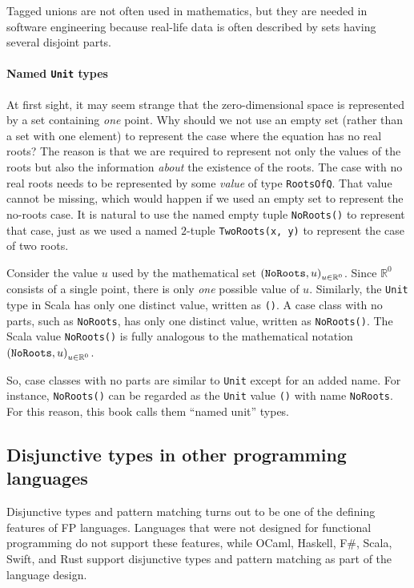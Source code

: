 Tagged unions are not often used in mathematics, but they are needed
in software engineering because real-life data is often described
by sets having several disjoint parts.

\paragraph{Named \texttt{Unit} types}

At first sight, it may seem strange that the zero-dimensional space
is represented by a set containing \emph{one} point. Why should we
not use an empty set (rather than a set with one element) to represent
the case where the equation has no real roots? The reason is that
we are required to represent not only the values of the roots but
also the information \emph{about} the existence of the roots. The
case with no real roots needs to be represented by some \emph{value}
of type \lstinline!RootsOfQ!. That value cannot be missing, which
would happen if we used an empty set to represent the no-roots case.
It is natural to use the named empty tuple \lstinline!NoRoots()!
to represent that case, just as we used a named $2$-tuple \lstinline!TwoRoots(x, y)!
to represent the case of two roots.

Consider the value $u$ used by the mathematical set $\left(\text{\texttt{NoRoots}},u\right)_{u\in\mathbb{R}^{0}}$.
Since $\mathbb{R}^{0}$ consists of a single point, there is only
\emph{one} possible value of $u$. Similarly, the \lstinline!Unit!
type in Scala has only one distinct value, written as \lstinline!()!.
A case class with no parts, such as \lstinline!NoRoots!, has only
one distinct value, written as \lstinline!NoRoots()!. The Scala value
\lstinline!NoRoots()! is fully analogous to the mathematical notation
$\left(\text{\texttt{NoRoots}},u\right)_{u\in\mathbb{R}^{0}}$.

So, case classes with no parts are similar to \lstinline!Unit! except
for an added name. For instance, \lstinline!NoRoots()! can be regarded
as the \lstinline!Unit! value \lstinline!()! with name \lstinline!NoRoots!.
For this reason, this book calls them \textsf{``}named unit\textsf{''} types.

\subsection{Disjunctive types in other programming languages}

Disjunctive types and pattern matching turns out to be one of the
defining features of FP languages. Languages that were not designed
for functional programming do not support these features, while OCaml,
Haskell, F\#, Scala, Swift, and Rust support disjunctive types and
pattern matching as part of the language design. 

